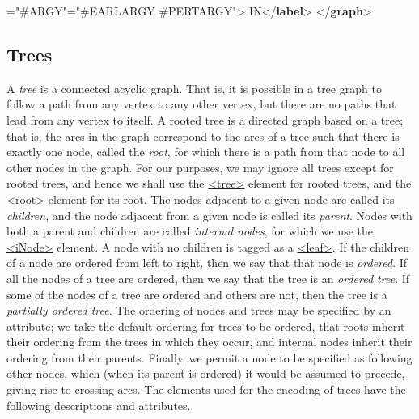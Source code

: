 \begin{shaded}
{\hspace*{1em}\hspace*{1em}{to}="{\#ARGY}"\hspace*{1em}{exclude}="{\#EARLARGY \#PERTARGY}">}\mbox{}\newline 
\hspace*{1em}IN{</\textbf{label}>}\mbox{}\newline 
{}\mbox{}\newline 
{</\textbf{graph}>}\end{shaded}\egroup\par 
\subsection[{Trees}]{Trees}\label{GDTR}\par
A \textit{tree} is a connected acyclic graph. That is, it is possible in a tree graph to follow a path from any vertex to any other vertex, but there are no paths that lead from any vertex to itself. A rooted tree is a directed graph based on a tree; that is, the arcs in the graph correspond to the arcs of a tree such that there is exactly one node, called the \textit{root}, for which there is a path from that node to all other nodes in the graph. For our purposes, we may ignore all trees except for rooted trees, and hence we shall use the \hyperref[TEI.tree]{<tree>} element for rooted trees, and the \hyperref[TEI.root]{<root>} element for its root. The nodes adjacent to a given node are called its \textit{children}, and the node adjacent from a given node is called its \textit{parent}. Nodes with both a parent and children are called \textit{internal nodes}, for which we use the \hyperref[TEI.iNode]{<iNode>} element. A node with no children is tagged as a \hyperref[TEI.leaf]{<leaf>}. If the children of a node are ordered from left to right, then we say that that node is \textit{ordered}. If all the nodes of a tree are ordered, then we say that the tree is an \textit{ordered tree}. If some of the nodes of a tree are ordered and others are not, then the tree is a \textit{partially ordered tree}. The ordering of nodes and trees may be specified by an attribute; we take the default ordering for trees to be ordered, that roots inherit their ordering from the trees in which they occur, and internal nodes inherit their ordering from their parents. Finally, we permit a node to be specified as following other nodes, which (when its parent is ordered) it would be assumed to precede, giving rise to crossing arcs. The elements used for the encoding of trees have the following descriptions and attributes. 
